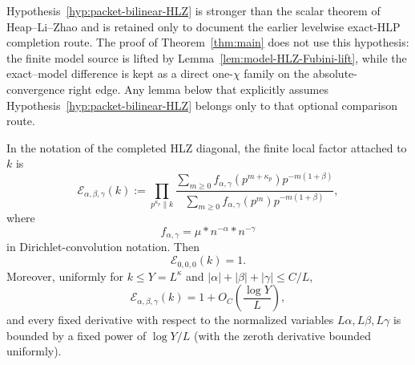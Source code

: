 \begin{remark}
Hypothesis~\ref{hyp:packet-bilinear-HLZ} is stronger than the scalar theorem of
Heap--Li--Zhao and is retained only to document the earlier levelwise
exact-HLP completion route.  The proof of Theorem~\ref{thm:main} does not use
this hypothesis: the finite model source is lifted by
Lemma~\ref{lem:model-HLZ-Fubini-lift}, while the exact--model difference is kept
as a direct one-$\chi$ family on the absolute-convergence right edge.  Any
lemma below that explicitly assumes Hypothesis~\ref{hyp:packet-bilinear-HLZ}
belongs only to that optional comparison route.
\end{remark}

\begin{lemma}
\label{lem:HLZ-finite-factor}
In the notation of the completed HLZ diagonal, the finite local factor attached
to $k$ is
\begin{equation}
\mathcal E_{\alpha,\beta,\gamma}(k)
:=\prod_{p^{\kappa_p}\parallel k}
\frac{\displaystyle\sum_{m\ge0}
 f_{\alpha,\gamma}(p^{m+\kappa_p})p^{-m(1+\beta)}}
{\displaystyle\sum_{m\ge0}
 f_{\alpha,\gamma}(p^m)p^{-m(1+\beta)}},
\label{eq:HLZ-finite-factor}
\end{equation}
where
\[
f_{\alpha,\gamma}=\mu* n^{-\alpha}*n^{-\gamma}
\]
in Dirichlet-convolution notation. Then
\begin{equation}
\boxed{\mathcal E_{0,0,0}(k)=1.}
\label{eq:HLZ-factor-zero}
\end{equation}
Moreover, uniformly for $k\le Y=L^\kappa$ and
$|\alpha|+|\beta|+|\gamma|\le C/L$,
\begin{equation}
\boxed{
\mathcal E_{\alpha,\beta,\gamma}(k)
=1+O_C\!\left(\frac{\log Y}{L}\right),
}
\label{eq:HLZ-factor-small}
\end{equation}
and every fixed derivative with respect to the normalized variables
$L\alpha,L\beta,L\gamma$ is bounded by a fixed power of
$\log Y/L$ (with the zeroth derivative bounded uniformly).
\end{lemma}

